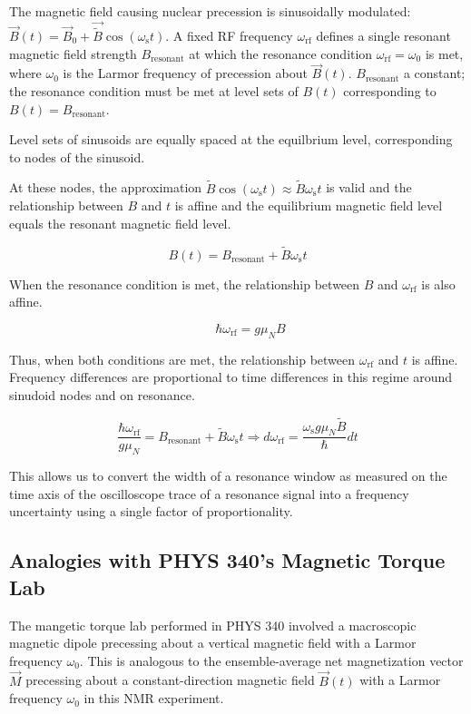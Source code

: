 \documentclass[11pt]{article}
\begin{document}
The magnetic field causing nuclear precession is sinusoidally
modulated: $\vec B(t) = \vec B_0 + \vec \tilde B
\cos(\omega_\text{s} t)$. A fixed RF frequency $\omega_\text{rf}$
defines a single resonant magnetic field strength $B_\text{resonant}$
at which the resonance
condition $\omega_\text{rf} = \omega_0$ is met, where $\omega_0$ is
the Larmor frequency of precession about $\vec B(t)$.
$B_\text{resonant}$ a constant; the resonance condition must be met
at level sets of $B(t)$ corresponding to $B(t) = B_\text{resonant}$.

Level sets of sinusoids are equally spaced at the equilbrium level,
corresponding to nodes of the sinusoid.

At these nodes, the
approximation $\tilde B \cos(\omega_\text{s} t) \approx \tilde B
\omega_\text{s} t$ is valid and the relationship between $B$ and $t$
is affine and the equilibrium magnetic field level equals the
resonant magnetic field level.

$$
B(t) = B_\text{resonant} + \tilde B \omega_\text{s} t
$$

When the resonance condition is met, the relationship between $B$ and
$\omega_\text{rf}$ is also affine.

$$
\quad \quad
\hbar \omega_\text{rf} = g \mu_N B
$$

Thus, when both conditions are met, the relationship between
$\omega_\text{rf}$ and $t$ is affine. Frequency differences
are proportional to time differences in this regime around sinudoid
nodes and on resonance.

$$
\frac{\hbar \omega_\text{rf}}{g \mu_N} = B_\text{resonant}+ \tilde B
\omega_\text{s} t \Rightarrow d\omega_\text{rf} =
\frac{\omega_\text{s} g \mu_N \tilde B}{\hbar} dt
$$

This allows us to convert the width of a resonance window as measured
on the time axis of the oscilloscope trace of a resonance signal into a
frequency uncertainty using a single factor of proportionality.

\subsection*{Analogies with PHYS 340's Magnetic Torque Lab}

The mangetic torque lab performed in PHYS 340 involved a macroscopic
magnetic dipole precessing about a vertical magnetic field with a
Larmor frequency $\omega_0$. This is analogous to the ensemble-average net
magnetization vector $\vec M$ precessing about a constant-direction
magnetic field $\vec B(t)$ with a Larmor frequency $\omega_0$ in this
NMR experiment.
\end{document}
